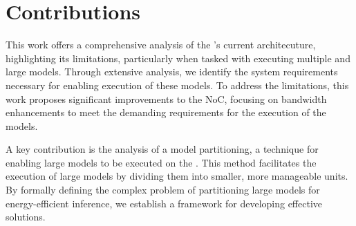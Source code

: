 \section{Contributions}


This work offers a comprehensive analysis of the \graicore{}'s current architecuture, highlighting its limitations, particularly when tasked with executing multiple and large models.
Through extensive analysis, we identify the system requirements necessary for enabling execution of these models.
To address the limitations, this work proposes significant improvements to the NoC, focusing on bandwidth enhancements to meet the demanding requirements for the execution of the models.

A key contribution is the analysis of a model partitioning, a technique for enabling large models to be executed on the \graicore{}.
This method facilitates the execution of large models by dividing them into smaller, more manageable units.
By formally defining the complex problem of partitioning large models for energy-efficient inference, we establish a framework for developing effective solutions.

